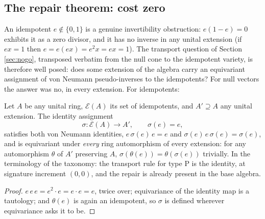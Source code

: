 \subsection{The repair theorem: cost zero}\label{subsec:selfrepair}

An idempotent $e \notin \{0,1\}$ is a genuine invertibility obstruction: $e(1-e) = 0$ exhibits it as a zero divisor, and it has no inverse in any unital extension (if $ex = 1$ then $e = e(ex) = e^2 x = ex = 1$). The transport question of Section \ref{sec:nogo}, transposed verbatim from the null cone to the idempotent variety, is therefore well posed: does some extension of the algebra carry an equivariant assignment of von Neumann pseudo-inverses to the idempotents? For null vectors the answer was no, in every extension. For idempotents:

\begin{proposition}\label{prop:selfrepair}
Let $A$ be any unital ring, $\mathcal{E}(A)$ its set of idempotents, and $A' \supseteq A$ any unital extension. The identity assignment
\[
\sigma : \mathcal{E}(A) \to A' , \qquad \sigma(e) = e,
\]
satisfies both von Neumann identities, $e\,\sigma(e)\,e = e$ and $\sigma(e)\,e\,\sigma(e) = \sigma(e)$, and is equivariant under \emph{every} ring automorphism of every extension: for any automorphism $\theta$ of $A'$ preserving $A$, $\sigma(\theta(e)) = \theta(\sigma(e))$ trivially. In the terminology of the taxonomy: the transport rule for type P is the identity, at signature increment $(0,0)$, and the repair is already present in the base algebra.
\end{proposition}

\begin{proof}
$e\,e\,e = e^2 \cdot e = e \cdot e = e$, twice over; equivariance of the identity map is a tautology; and $\theta(e)$ is again an idempotent, so $\sigma$ is defined wherever equivariance asks it to be.
\end{proof}

